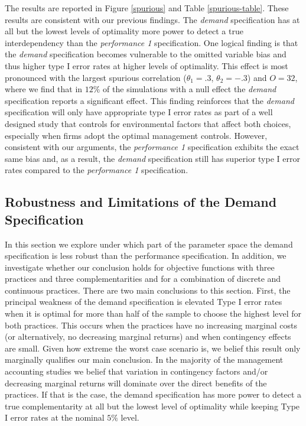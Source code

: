 \documentclass[12pt]{article}
\begin{document}
The results are reported in Figure \ref{spurious} and Table \ref{spurious-table}. These results are consistent with our previous findings. The \emph{demand} specification has at all but the lowest levels of optimality more power to detect a true interdependency than the \emph{performance 1} specification. One logical finding is that the \emph{demand} specification becomes vulnerable to the omitted variable bias and thus higher type I error rates at higher levels of optimality. This effect is most pronounced with the largest spurious correlation (\(\theta_1 = .3\), \(\theta_2 = -.3\)) and \(O = 32\), where we find that in $12\%$ of the simulations with a null effect the \emph{demand} specification reports a significant effect. This finding reinforces that the \emph{demand} specification will only have appropriate type I error rates as part of a well designed study that controls for environmental factors that affect both choices, especially when firms adopt the optimal management controls. However, consistent with our arguments, the \emph{performance 1} specification exhibits the exact same bias and, as a result, the \emph{demand} specification still has superior type I error rates compared to the \emph{performance 1} specification.

\subsection{Robustness and Limitations of the Demand Specification}

In this section we explore under which part of the parameter space the demand specification is less robust than the performance specification. In addition, we investigate whether our conclusion holds for objective functions with three practices and three complementarities and for a combination of discrete and continuous practices. There are two main conclusions to this section. First, the principal weakness of the demand specification is elevated Type I error rates when it is optimal for more than half of the sample to choose the highest level for both practices. This occurs when the practices have no increasing marginal costs (or alternatively, no decreasing marginal returns) and when contingency effects are small. Given how extreme the worst case scenario is, we belief this result only marginally qualifies our main conclusion. In the majority of the management accounting studies we belief that variation in contingency factors and/or decreasing marginal returns will dominate over the direct benefits of the practices. If that is the case, the demand specification has more power to detect a true complementarity at all but the lowest level of optimality while keeping Type I error rates at the nominal $5\%$ level.
\end{document}
